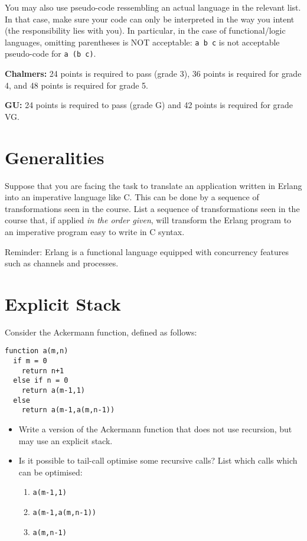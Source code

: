 \documentclass{article}
\begin{document}
You may also use pseudo-code ressembling an actual language in the
relevant list. In that case, make sure your code can only be
interpreted in the way you intent (the responsibility lies with
you). In particular, in the case of functional/logic languages,
omitting parentheses is NOT acceptable: \texttt{a b c} is not
acceptable pseudo-code for \texttt{a (b c)}.

  
\textbf{Chalmers:}
24 points is required to pass (grade 3), 36 points is required for
grade 4, and 48 points is required for grade 5. 

\textbf{GU:} 
24 points is required to pass (grade G) and 42 points is
required for grade VG.

\section{Generalities}

Suppose that you are facing the task to translate an application
written in Erlang into an imperative language like C. This can be done
by a sequence of transformations seen in the course.  List a sequence
of transformations seen in the course that, if applied \emph{in the
  order given}, will transform the Erlang program to an imperative
program easy to write in C syntax.

Reminder: Erlang is a functional language equipped with concurrency
features such as channels and processes.

\section{Explicit Stack}

Consider the Ackermann function, defined as follows:

\begin{verbatim}
function a(m,n) 
  if m = 0 
    return n+1
  else if n = 0
    return a(m-1,1)
  else
    return a(m-1,a(m,n-1))
\end{verbatim}

\begin{itemize}
\item Write a version of the Ackermann function that does not use
  recursion, but may use an explicit stack.
\item Is it possible to tail-call optimise some recursive
  calls? List which calls which can be optimised:
  \begin{enumerate}
  \item \texttt{a(m-1,1)}
  \item \texttt{a(m-1,a(m,n-1))}
  \item \texttt{a(m,n-1)}
  \end{enumerate}
\end{itemize}
\end{document}

